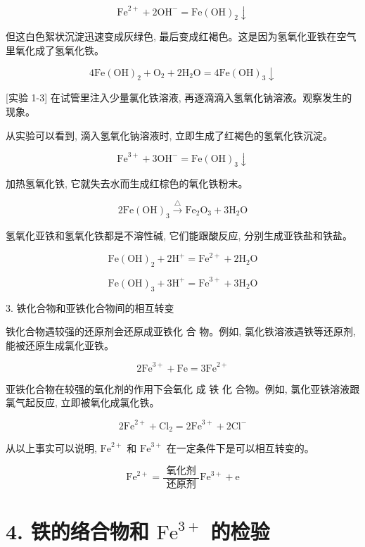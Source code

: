 \documentclass[10pt]{article}
\begin{document}
\[
{\mathrm{{Fe}}}^{2 + } + 2{\mathrm{{OH}}}^{ - } = \mathrm{{Fe}}{\left( \mathrm{{OH}}\right) }_{2} \downarrow
\]

但这白色絮状沉淀迅速变成灰绿色, 最后变成红褐色。这是因为氢氧化亚铁在空气里氧化成了氢氧化铁。

\[
4\mathrm{{Fe}}{\left( \mathrm{{OH}}\right) }_{2} + {\mathrm{O}}_{2} + 2{\mathrm{H}}_{2}\mathrm{O} = 4\mathrm{{Fe}}{\left( \mathrm{{OH}}\right) }_{3} \downarrow
\]

[实验 1-3] 在试管里注入少量氯化铁溶液, 再逐滴滴入氢氧化钠溶液。观察发生的现象。

从实验可以看到, 滴入氢氧化钠溶液时, 立即生成了红褐色的氢氧化铁沉淀。

\[
{\mathrm{{Fe}}}^{3 + } + 3{\mathrm{{OH}}}^{ - } = \mathrm{{Fe}}{\left( \mathrm{{OH}}\right) }_{3} \downarrow
\]

加热氢氧化铁, 它就失去水而生成红棕色的氧化铁粉末。

\[
2\mathrm{{Fe}}{\left( \mathrm{{OH}}\right) }_{3}\xrightarrow[]{\bigtriangleup }{\mathrm{{Fe}}}_{2}{\mathrm{O}}_{3} + 3{\mathrm{H}}_{2}\mathrm{O}
\]

氢氧化亚铁和氢氧化铁都是不溶性碱, 它们能跟酸反应, 分别生成亚铁盐和铁盐。

\[
\mathrm{{Fe}}{\left( \mathrm{{OH}}\right) }_{2} + 2{\mathrm{H}}^{ + } = {\mathrm{{Fe}}}^{2 + } + 2{\mathrm{H}}_{2}\mathrm{O}
\]

\[
\mathrm{{Fe}}{\left( \mathrm{{OH}}\right) }_{3} + 3{\mathrm{H}}^{ + } = {\mathrm{{Fe}}}^{3 + } + 3{\mathrm{H}}_{2}\mathrm{O}
\]

3. 铁化合物和亚铁化合物间的相互转变

铁化合物遇较强的还原剂会还原成亚铁化 合 物。例如, 氯化铁溶液遇铁等还原剂, 能被还原生成氯化亚铁。

\[
2{\mathrm{{Fe}}}^{3 + } + \mathrm{{Fe}} = 3{\mathrm{{Fe}}}^{2 + }
\]

亚铁化合物在较强的氧化剂的作用下会氧化 成 铁 化 合物。例如, 氯化亚铁溶液跟氯气起反应, 立即被氧化成氯化铁。

\[
2{\mathrm{{Fe}}}^{2 + } + {\mathrm{{Cl}}}_{2} = 2{\mathrm{{Fe}}}^{3 + } + 2{\mathrm{{Cl}}}^{ - }
\]

从以上事实可以说明, \({\mathrm{{Fe}}}^{2 + }\) 和 \({\mathrm{{Fe}}}^{3 + }\) 在一定条件下是可以相互转变的。

\[
{\mathrm{{Fe}}}^{2 + } = \frac{\text{ 氧化剂 }}{\text{ 还原剂 }}{\mathrm{{Fe}}}^{3 + } + \mathrm{e}
\]

\section*{4. 铁的络合物和 \({\mathrm{{Fe}}}^{3 + }\) 的检验}
\end{document}
